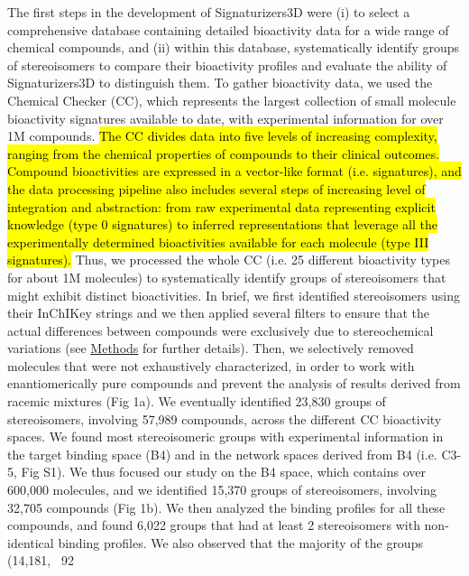 The first steps in the development of Signaturizers3D were (i) to select a comprehensive database containing detailed bioactivity data for a wide range of chemical compounds, and (ii) within this database, systematically identify groups of stereoisomers to compare their bioactivity profiles and evaluate the ability of Signaturizers3D to distinguish them.
To gather bioactivity data, we used the Chemical Checker (CC), which represents the largest collection of small molecule bioactivity signatures available to date, with experimental information for over 1M compounds\cite{duran-frigola_extending_2020}. \hl{The CC divides data into five levels of increasing complexity, ranging from the chemical properties of compounds to their clinical outcomes. Compound bioactivities are expressed in a vector-like format (i.e. signatures), and the data processing pipeline also includes several steps of increasing level of integration and abstraction: from raw experimental data representing explicit knowledge (type 0 signatures) to inferred representations that leverage all the experimentally determined bioactivities available for each molecule (type III signatures).} Thus, we processed the whole CC (i.e. 25 different bioactivity types for about 1M molecules) to systematically identify groups of stereoisomers that might exhibit distinct bioactivities. In brief, we first identified stereoisomers using their InChIKey strings and we then applied several filters to ensure that the actual differences between compounds were exclusively due to stereochemical variations (see \href{Stereoisomers_Methods}{Methods} for further details). Then, we selectively removed molecules that were not exhaustively characterized, in order to work with enantiomerically pure compounds and prevent the analysis of results derived from racemic mixtures (Fig 1a). We eventually identified 23,830 groups of stereoisomers, involving 57,989 compounds, across the different CC bioactivity spaces. We found most stereoisomeric groups with experimental information in the target binding space (B4) and in the network spaces derived from B4 (i.e. C3-5, Fig S1). We thus focused our study on the B4 space, which contains over 600,000 molecules, and we identified 15,370 groups of stereoisomers, involving 32,705 compounds (Fig 1b). We then analyzed the binding profiles for all these compounds, and found 6,022 groups that had at least 2 stereoisomers with non-identical binding profiles. We also observed that the majority of the groups (14,181, ~92%